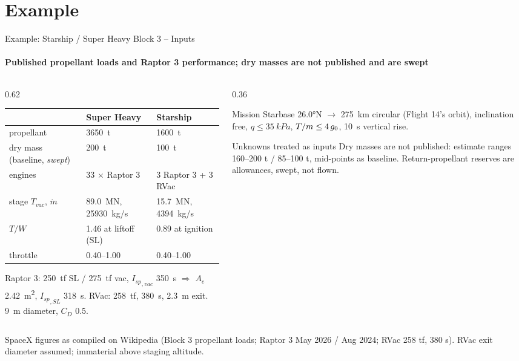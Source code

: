 \documentclass[aspectratio=169,10pt]{beamer}
\providecommand{\Isp}{{I_{sp}}}\providecommand{\cstar}{{c^{*}}}\providecommand{\CF}{{C_F}}\providecommand{\mdot}{\dot m}
\providecommand{\src}[1]{\vfill\hfill{\tiny\color{gray}#1}}
\begin{document}
\section{Example}
\begin{frame}{Example: Starship / Super Heavy Block 3 -- Inputs}
  \framesubtitle{Published propellant loads and Raptor 3 performance; dry masses are not published and are swept}
  \footnotesize
  \begin{columns}[T]
    \begin{column}{0.62\textwidth}
      \begin{tabular}{p{2.4cm}p{2.7cm}p{2.7cm}}
        \toprule
         & Super Heavy & Starship \\
        \midrule
        propellant & \SI{3650}{\tonne} & \SI{1600}{\tonne} \\
        dry mass (baseline, \emph{swept}) & \SI{200}{\tonne} & \SI{100}{\tonne} \\
        engines & 33 $\times$ Raptor 3 & 3 Raptor 3 + 3 RVac \\
        stage $T_{vac}$, $\mdot$ & \SI{89.0}{MN}, \SI{25930}{kg/s} & \SI{15.7}{MN}, \SI{4394}{kg/s} \\
        $T/W$ & 1.46 at liftoff (SL) & 0.89 at ignition \\
        throttle & 0.40--1.00 & 0.40--1.00 \\
        \bottomrule
      \end{tabular}
      \vspace{4pt}

      Raptor 3: \SI{250}{tf} SL / \SI{275}{tf} vac, $\Isp_{,vac}$ \SI{350}{s} $\Rightarrow$ $A_e$ \SI{2.42}{m^2}, $\Isp_{,SL}$ \SI{318}{s}.\;
      RVac: \SI{258}{tf}, \SI{380}{s}, \SI{2.3}{m} exit.\; \SI{9}{m} diameter, $C_D$ 0.5.
    \end{column}
    \begin{column}{0.36\textwidth}
      \begin{block}{Mission}
        Starbase \ang{26.0}N $\to$ \SI{275}{km} circular (Flight 14's orbit), inclination free, $q\le\SI{35}{kPa}$, $T/m\le4\,g_0$, \SI{10}{s} vertical rise.
      \end{block}
      \begin{block}{Unknowns treated as inputs}
        Dry masses are not published: estimate ranges 160--200 t / 85--100 t, mid-points as baseline. Return-propellant reserves are allowances, swept, not flown.
      \end{block}
    \end{column}
  \end{columns}
  \src{SpaceX figures as compiled on Wikipedia (Block 3 propellant loads; Raptor 3 May 2026 / Aug 2024; RVac 258 tf, 380 s). RVac exit diameter assumed; immaterial above staging altitude.}
\end{frame}
\end{document}
